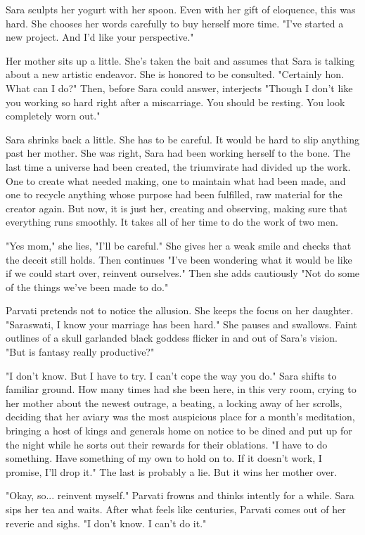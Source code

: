 \documentclass{article}
\begin{document}
Sara sculpts her yogurt with her spoon. Even with her gift of eloquence, this was hard. She chooses her words carefully to buy herself more time. "I've started a new project. And I'd like your perspective."

Her mother sits up a little. She's taken the bait and assumes that Sara is talking about a new artistic endeavor. She is honored to be consulted. "Certainly hon. What can I do?" Then, before Sara could answer, interjects "Though I don't like you working so hard right after a miscarriage. You should be resting. You look completely worn out."

Sara shrinks back a little. She has to be careful. It would be hard to slip anything past her mother. She was right, Sara had been working herself to the bone. The last time a universe had been created, the triumvirate had divided up the work. One to create what needed making, one to maintain what had been made, and one to recycle anything whose purpose had been fulfilled, raw material for the creator again. But now, it is just her, creating and observing, making sure that everything runs smoothly. It takes all of her time to do the work of two men. 

"Yes mom," she lies, "I'll be careful." She gives her a weak smile and checks that the deceit still holds. Then continues "I've been wondering what it would be like if we could start over, reinvent ourselves." Then she adds cautiously "Not do some of the things we've been made to do." 

Parvati pretends not to notice the allusion. She keeps the focus on her daughter. "Saraswati, I know your marriage has been hard." She pauses and swallows. Faint outlines of a skull garlanded black goddess flicker in and out of Sara's vision. "But is fantasy really productive?"

"I don't know. But I have to try. I can't cope the way you do." Sara shifts to familiar ground. How many times had she been here, in this very room, crying to her mother about the newest outrage, a beating, a locking away of her scrolls, deciding that her aviary was the most auspicious place for a month's meditation, bringing a host of kings and generals home on notice to be dined and put up for the night while he sorts out their rewards for their oblations. "I have to do something. Have something of my own to hold on to. If it doesn't work, I promise, I'll drop it." The last is probably a lie. But it wins her mother over.

"Okay, so... reinvent myself." Parvati frowns and thinks intently for a while. Sara sips her tea and waits. After what feels like centuries, Parvati comes out of her reverie and sighs. "I don't know. I can't do it." 
\end{document}
